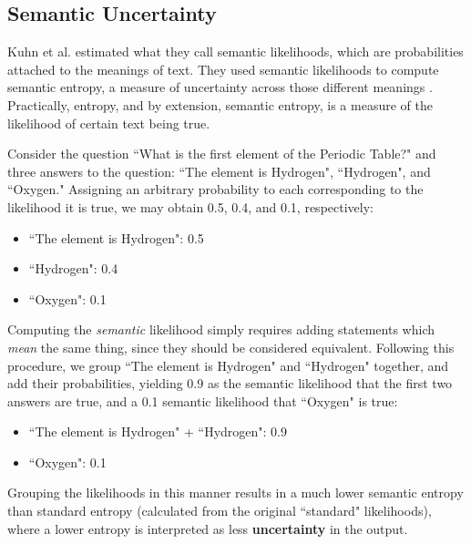 \documentclass[letterpaper,12pt]{article}
\begin{document}
\subsection{Semantic Uncertainty}
\label{sec:semantic-uncertainty}

Kuhn et al. estimated what they call semantic likelihoods, which are probabilities attached to the meanings of text. They used semantic likelihoods to compute semantic entropy, a measure of uncertainty across those different meanings \cite{kuhn2023semantic}. Practically, entropy, and by extension, semantic entropy, is a measure of the likelihood of certain text being true.

Consider the question ``What is the first element of the Periodic Table?" and three answers to the question: ``The element is Hydrogen", ``Hydrogen", and ``Oxygen." Assigning an arbitrary probability to each corresponding to the likelihood it is true, we may obtain 0.5, 0.4, and 0.1, respectively:
\begin{itemize}
    \item ``The element is Hydrogen": 0.5
    \item ``Hydrogen": 0.4
    \item ``Oxygen": 0.1
\end{itemize}
Computing the \emph{semantic} likelihood simply requires adding statements which \emph{mean} the same thing, since they should be considered equivalent. Following this procedure, we group ``The element is Hydrogen" and ``Hydrogen" together, and add their probabilities, yielding 0.9 as the semantic likelihood that the first two answers are true, and a 0.1 semantic likelihood that ``Oxygen" is true:
\begin{itemize}
    \item ``The element is Hydrogen" + ``Hydrogen": 0.9
    \item ``Oxygen": 0.1
\end{itemize}
Grouping the likelihoods in this manner results in a much lower semantic entropy than standard entropy (calculated from the original ``standard" likelihoods), where a lower entropy is interpreted as less \textbf{uncertainty} in the output.
\end{document}

